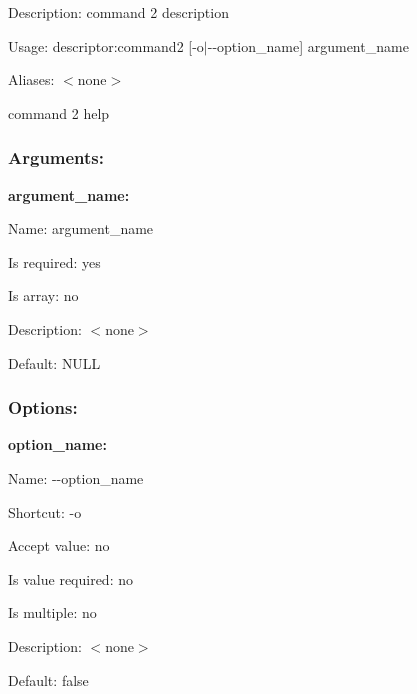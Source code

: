 
\begin{DoxyItemize}
\item Description\+: command 2 description
\item Usage\+: {\ttfamily descriptor\+:command2 [-\/o$\vert$-\/-\/option\+\_\+name] argument\+\_\+name}
\item Aliases\+: $<$none$>$
\end{DoxyItemize}

command 2 help

\subsubsection*{Arguments\+:}

{\bfseries argument\+\_\+name\+:}


\begin{DoxyItemize}
\item Name\+: argument\+\_\+name
\item Is required\+: yes
\item Is array\+: no
\item Description\+: $<$none$>$
\item Default\+: {\ttfamily N\+U\+L\+L}
\end{DoxyItemize}

\subsubsection*{Options\+:}

{\bfseries option\+\_\+name\+:}


\begin{DoxyItemize}
\item Name\+: {\ttfamily -\/-\/option\+\_\+name}
\item Shortcut\+: {\ttfamily -\/o}
\item Accept value\+: no
\item Is value required\+: no
\item Is multiple\+: no
\item Description\+: $<$none$>$
\item Default\+: {\ttfamily false} 
\end{DoxyItemize}